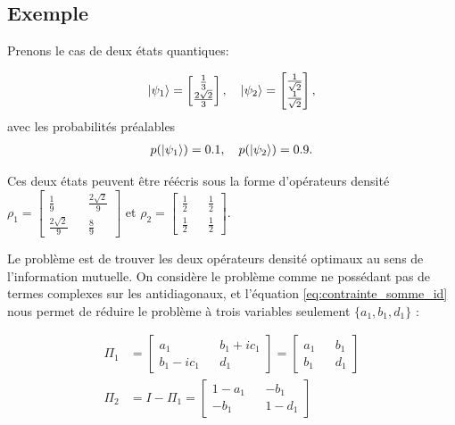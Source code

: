 \documentclass[12pt,a4paper]{article}
\begin{document}
    \subsection*{Exemple}

    Prenons le cas de deux états quantiques:

    \begin{align}
        \ket{\psi_1} = \begin{bmatrix}\frac{1}{3} \\ \frac{2 \sqrt{2}}{3}\end{bmatrix} , \quad \ket{\psi_2} = \begin{bmatrix}\frac{1}{\sqrt{2}} \\ \frac{1}{\sqrt{2}}\end{bmatrix},
    \end{align}
    avec les probabilités préalables 
    \begin{align}
        p(\ket{\psi_1}) = 0.1, \quad p(\ket{\psi_2}) = 0.9.
    \end{align}

    Ces deux états peuvent être réécris sous la forme d'opérateurs densité $\rho_1 = \begin{bmatrix}\frac{1}{9} && \frac{2 \sqrt{2}}{9} \\ \frac{2 \sqrt{2}}{9} && \frac{8}{9} \end{bmatrix}$ et $\rho_2 = \begin{bmatrix}\frac{1}{2} && \frac{1}{2} \\ \frac{1}{2} && \frac{1}{2} \end{bmatrix}$.

    Le problème est de trouver les deux opérateurs densité optimaux au sens de l'information mutuelle. On considère le problème comme ne possédant pas de termes complexes sur les antidiagonaux, et l'équation \ref{eq:contrainte_somme_id} nous permet de réduire le problème à trois variables seulement $\{a_1, b_1, d_1\}$ :

    \begin{align}
        \Pi_1 &= \begin{bmatrix}a_1 && b_1 + ic_1 \\ b_1 - ic_1 && d_1\end{bmatrix} = \begin{bmatrix}a_1 && b_1 \\ b_1 && d_1\end{bmatrix} \\
        \Pi_2 &= I - \Pi_1 = \begin{bmatrix}1 - a_1 && -b_1 \\ -b_1 && 1 - d_1\end{bmatrix}
    \end{align}
\end{document}
